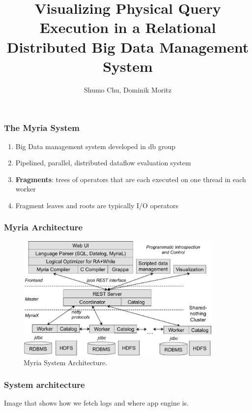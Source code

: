 \documentclass[xetex,mathserif,serif]{beamer}
\title[Query Visualization] %
{Visualizing Physical Query Execution in a Relational Distributed Big Data Management System}
\subtitle{}
\author[Chu, moritz] %
{Shumo Chu, Dominik Moritz}
\begin{document}
\begin{frame}
\titlepage
\end{frame}

\begin{frame}
\frametitle{The Myria System}
\begin{enumerate}
	\item Big Data management system developed in db group
	\item Pipelined, parallel, distributed dataflow evaluation system
	\item \textbf{Fragments}: trees of operators that are each executed on one thread in each worker
	\item Fragment leaves and roots are typically I/O operators
\end{enumerate}
\end{frame}

\begin{frame}
\frametitle{Myria Architecture}
\begin{figure}
 \begin{center}
     \includegraphics[width=0.9\textwidth]{arch}
   \end{center}
  \caption{Myria System Architecture.}
  \label{fig:myria_arc}
\end{figure}
\end{frame}

\begin{frame}
\frametitle{System architecture}
Image that shows how we fetch logs and where app engine is.
\end{frame}
\end{document}
